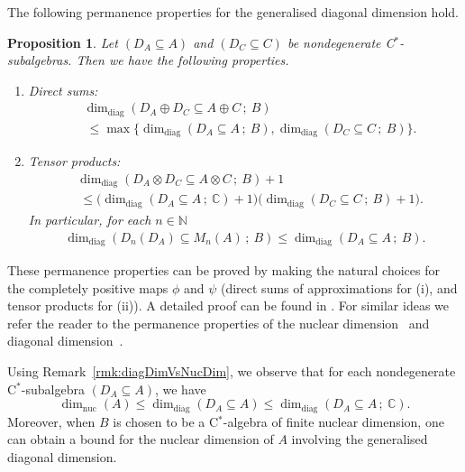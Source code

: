 \documentclass[a4paper]{amsart}
\newcommand{\myhyp}{\textnormal{-}\hskip0pt\relax}
\numberwithin{equation}{section}
\newcommand{\N}{\mathbb{N}}
\newcommand{\C}{\mathbb{C}}
\newcommand{\cstar}{C$^\ast$\myhyp{}algebra}
\newcommand{\cstarSub}{C$^\ast$\myhyp{}subalgebra}
\newcommand{\dimnuc}[1]{\dim_{\mathrm{nuc}}({#1})}
\newcommand{\ddim}[2]{\dim_{\mathrm{diag}}({#1}\subseteq{#2})}
\newcommand{\ddimn}[3]{\dim_{\mathrm{diag}}({#1}\subseteq{#2}\, ;~{#3})}
\theoremstyle{plain}
\newtheorem{propo}[thm]{Proposition}
\theoremstyle{indented}
\numberwithin{equation}{section}
\theoremstyle{definition}
\theoremstyle{remark}
\theoremstyle{plain}
\theoremstyle{definition}
\begin{document}
The following permanence properties for the generalised diagonal dimension hold.

\begin{propo} \label{prop:permProp}
    Let ${(D_A \subseteq A)}$ and ${(D_C \subseteq C)}$ be nondegenerate \cstarSub{}s.
    Then we have the following properties.
   { \begin{enumerate} \renewcommand{\labelenumi}{(\roman{enumi})}
        \item Direct sums:
    \begin{align*}
        &\ddimn{D_A\oplus D_C}{A \oplus C }{B} \\
       &~\le \max \{ 
       \ddimn{D_A}{A}{B}, 
       \ddimn{D_C}{C}{B} \} .
    \end{align*}
        \item Tensor products:
        \begin{align*}
       &\ddimn{D_A\otimes D_C}{A \otimes C }{B} +1 \\
       &~\le \big( \ddimn{D_A}{A}{\C}+1\big) \big(\ddimn{D_C}{C}{B} +1 \big).
    \end{align*}
    In particular, for each $n \in \N$
    \begin{align*}
        \ddimn{D_n(D_A)}{M_n(A)}{B} \le \ddimn{D_A}{A}{B}.
    \end{align*}
    \end{enumerate}
}
\end{propo}

These permanence properties can be proved by making the natural choices
for the completely positive maps $\phi$ and $\psi$
(direct sums of approximations for (i), and tensor products for (ii)). 
A detailed proof can be found in \cite{Kitsios2025PhDThesis}. 
For similar ideas we refer the reader to the permanence properties
of the nuclear dimension~\cite{WinterZacharias2010nucDim} and 
diagonal dimension~\cite{LiLiaoWinter2023diagDim}.

\smallskip

Using Remark~\ref{rmk:diagDimVsNucDim},
we observe that 
for each nondegenerate \cstarSub{} 
\linebreak
${(D_A \subseteq A)}$, we have
\begin{equation*}
    \dimnuc{A} \le \ddim{D_A}{A} \le \ddimn{D_A}{A}{\C}.
\end{equation*}
Moreover, when $B$ is chosen to be a \cstar{} of finite nuclear dimension,
one can obtain a bound for the nuclear dimension of $A$ 
involving the generalised diagonal dimension.
 
\end{document}
